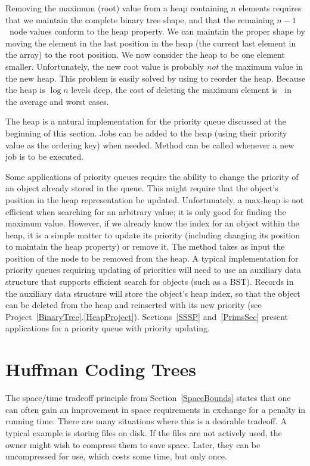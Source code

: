 Removing the maximum (root) value from a heap
containing \(n\) elements requires that we maintain the complete binary
tree shape, and that the remaining \(n-1\)~node values conform to the
heap property.
We can maintain the proper shape by moving the element in the last
position in the heap (the current last element in the array) to the
root position.
We now consider the heap to be one element smaller.
Unfortunately, the new root value is probably
\emph{not} the maximum value in the new heap.
This problem is easily solved by using  to reorder the
heap.
Because the heap is \(\log n\) levels deep, the cost of deleting the
maximum element is \Thetalogn\ in the average and worst cases.

The heap is a natural implementation for the priority queue discussed
at the beginning of this section.
Jobs can be added to the heap (using their priority value as the
ordering key) when needed.
Method  can be called whenever a new job is to be
executed.

Some applications of priority queues require the ability to change the
priority of an object already stored in the queue.
This might require that the object's position in the heap representation
be updated.
Unfortunately, a max-heap is not efficient when searching for an
arbitrary value; it is only good for finding the maximum value.
However, if we already know the index for an object within the heap,
it is a simple matter to update its priority (including changing its
position to maintain the heap property) or remove it.
The  method takes as input the position of the
node to be removed from the heap.
A typical implementation for priority queues requiring updating of
priorities will need to use an auxiliary data structure that supports
efficient search for objects (such as a BST).
Records in the auxiliary data structure will store
the object's heap index, so that the object can be
deleted from the heap and reinserted with its new priority
(see Project~\ref{BinaryTree}.\ref{HeapProject}).
Sections~\ref{SSSP} and~\ref{PrimsSec} present applications for a
priority queue with priority updating.

\section{Huffman Coding Trees}
\label{Huffman}

The space/time tradeoff principle
from Section~\ref{SpaceBounds} states that one can often gain an
improvement in space requirements in exchange for a penalty in running
time.
There are many situations where this is a desirable tradeoff.
A typical example is storing files on disk.
If the files are not actively used, the owner might wish to
compress them to save space.
Later, they can be uncompressed for use, which costs some time,
but only once.


